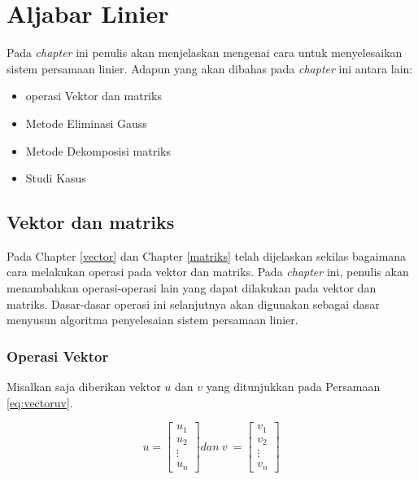 \documentclass[
]{book}
\providecommand{\tightlist}{%
  \setlength{\itemsep}{0pt}\setlength{\parskip}{0pt}}
\theoremstyle{definition}
\theoremstyle{definition}
\theoremstyle{definition}
\theoremstyle{definition}
\theoremstyle{remark}
\begin{document}
\hypertarget{linearaljabar}{%
\chapter{Aljabar Linier}\label{linearaljabar}}

Pada \emph{chapter} ini penulis akan menjelaskan mengenai cara untuk menyelesaikan sistem persamaan linier. Adapun yang akan dibahas pada \emph{chapter} ini antara lain:

\begin{itemize}
\tightlist
\item
  operasi Vektor dan matriks
\item
  Metode Eliminasi Gauss
\item
  Metode Dekomposisi matriks
\item
  Studi Kasus
\end{itemize}

\hypertarget{vecmat}{%
\section{Vektor dan matriks}\label{vecmat}}

Pada Chapter \ref{vector} dan Chapter \ref{matriks} telah dijelaskan sekilas bagaimana cara melakukan operasi pada vektor dan matriks. Pada \emph{chapter} ini, penulis akan menambahkan operasi-operasi lain yang dapat dilakukan pada vektor dan matriks. Dasar-dasar operasi ini selanjutnya akan digunakan sebagai dasar menyusun algoritma penyelesaian sistem persamaan linier.

\hypertarget{operasivektor}{%
\subsection{Operasi Vektor}\label{operasivektor}}

Misalkan saja diberikan vektor \(u\) dan \(v\) yang ditunjukkan pada Persamaan \eqref{eq:vectoruv}.

\begin{equation}
u = \begin{bmatrix}
      u_1            \\[0.3em]
      u_2            \\[0.3em]
      \vdots         \\[0.3em] 
      u_n
     \end{bmatrix}
dan\ v\ = \begin{bmatrix}
      v_1            \\[0.3em]
      v_2            \\[0.3em]
      \vdots         \\[0.3em] 
      v_n
     \end{bmatrix}
  \label{eq:vectoruv}
\end{equation}
\end{document}

